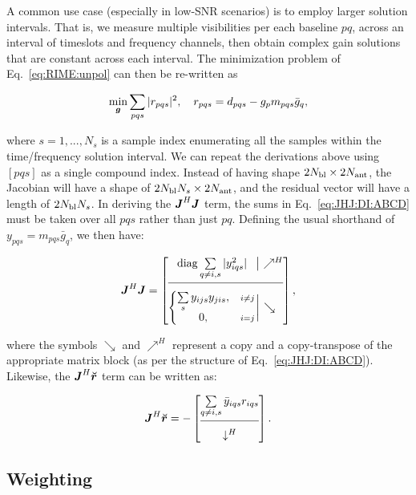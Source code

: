 \documentclass[useAMS,usenatbib]{mn2e}
\newcommand{\mat}[1]{{\bmath{#1}}}
\newcommand{\JJ}{\mat{J}} %
\newcommand{\JHJ}{\JJ^H\JJ} %
\begin{document}
\newcommand{\Ns}{N_s}

A common use case (especially in low-SNR scenarios) is to employ larger solution intervals. 
That is, we measure multiple visibilities per each baseline $pq$, across an interval of timeslots and
frequency channels, then obtain complex gain solutions that are constant across each interval. The 
minimization problem of Eq.~\ref{eq:RIME:unpol} can then be re-written as

\begin{equation}
\label{eq:cal:DI:tf}
\min_{\bmath{g}}\sum_{pqs}|r_{pqs}|^2, 
~~~r_{pqs} = d_{pqs}-g_p m_{pqs} \bar{g}_q, 
\end{equation}

where $s=1,...,N_s$ is a sample index enumerating all the samples within the 
time/frequency solution interval. We can repeat the derivations above using  $[pqs]$ as a
single compound index. Instead of having shape $2N_\mathrm{bl}\times2N_\mathrm{ant}$, the Jacobian 
will have a shape of $2\Nbl\Ns\times 2\Na$, and the residual vector will have a length of 
$2\Nbl\Ns$. In deriving the $\JHJ$ term, the sums in Eq.~\ref{eq:JHJ:DI:ABCD} must be taken over all $pqs$ 
rather than just $pq$. Defining the usual shorthand of 
$y_{pqs}=m_{pqs}\bar{g}_q$, we then have:

\begin{equation}
\label{eq:JHJ:DI:tf}
\JJ^H \JJ = 
\JHJblocks{
  \mathrm{diag} \sum\limits_{q\ne i,s} |y^2_{iqs}| 
}{
  \left \{ 
  \begin{array}{@{}cc@{}}
   \sum\limits_{s} y_{ijs}y_{jis},&{\scriptstyle i\ne j} \\
   0, &{\scriptstyle i=j}
  \end{array} \right . 
},
\end{equation}

where the symbols $\searrow$ and $\nearrow^H$ represent a copy and a copy-transpose of the appropriate matrix block (as per the structure of Eq.~\ref{eq:JHJ:DI:ABCD}). Likewise, the $\JJ^H\Rr$ term can be written as:

\begin{equation}
\label{eq:JHR:DI:tf}
\JJ^H\Rr 
= -\Matrix{c}{
\sum\limits_{q\ne i,s} \bar{y}_{iqs} r_{iqs}   \\
 \hline \\[-8pt]
\downarrow^H
}.
\end{equation}

\subsection{Weighting}
\label{sec:DI:W}
\end{document}
